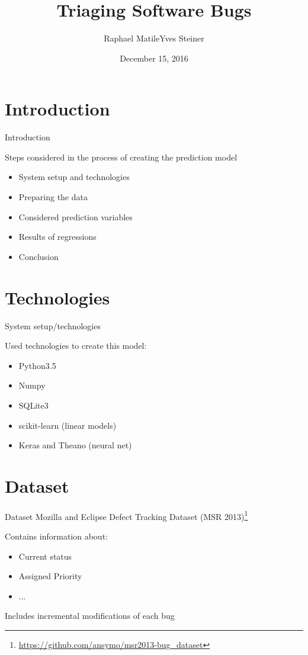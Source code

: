 \documentclass[xcolor=svgnames,handout]{beamer}
\title
  [Triaging Bugs\hspace{2em}]
  {Triaging Software Bugs}
\author
  [Matile, Steiner]
  {Raphael Matile\quad Yves Steiner}
\date
  {December 15, 2016}
\institute
  {Big Data and Business Analytics}
\begin{document}
\maketitle

\section
  {Introduction}

\begin{frame}
  {Introduction}

  Steps considered in the process of creating the prediction model\pause

  \begin{itemize}
  \item System setup and technologies \pause
  \item Preparing the data\pause
  \item Considered prediction variables\pause
  \item Results of regressions\pause
  \item Conclusion
  \end{itemize}
\end{frame}

\section
  {Technologies}

\begin{frame}
  {System setup/technologies}

Used technologies to create this model:\pause

  \begin{itemize}
  \item Python3.5 \pause
  \item Numpy \pause
  \item SQLite3 \pause
  \item scikit-learn (linear models) \pause
  \item Keras and Theano (neural net)
  \end{itemize}
  
\end{frame}

\section{Dataset}
\begin{frame}
  {Dataset}
  Mozilla and Eclipse Defect Tracking Dataset (MSR 2013)\footnote{\url{https://github.com/ansymo/msr2013-bug_dataset}} \bigbreak
 
  Contains information about: 
  \begin{itemize}
      \item Current status
      \item Assigned Priority
      \item ...
  \end{itemize}
  \bigbreak
    Includes incremental modifications of each bug
  
\end{frame}
\end{document}
